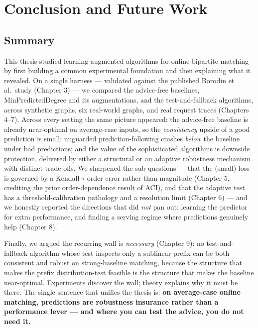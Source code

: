 \chapter{Conclusion and Future Work}\label{conclusion-and-future-work}

\section{Summary}\label{summary}

This thesis studied learning-augmented algorithms for online bipartite matching by first
building a common experimental foundation and then explaining what it revealed. On a single
harness --- validated against the published Borodin et al.~study (Chapter 3) --- we compared the
advice-free baselines, MinPredictedDegree and its augmentations, and the test-and-fallback
algorithms, across synthetic graphs, six real-world graphs, and real request traces
(Chapters 4--7). Across every setting the same picture appeared: the advice-free baseline is
already near-optimal on average-case inputs, so the \emph{consistency} upside of a good prediction
is small; unguarded prediction-following crashes \emph{below} the baseline under bad predictions;
and the value of the sophisticated algorithms is downside protection, delivered by either a
structural or an adaptive robustness mechanism with distinct trade-offs. We sharpened the
sub-questions --- that the (small) loss is governed by a Kendall-\(\tau\) order error rather than
magnitude (Chapter 5, crediting the prior order-dependence result of ACI), and that the
adaptive test has a threshold-calibration pathology and a resolution limit (Chapter 6) --- and
we honestly reported the directions that did \emph{not} pan out: learning the predictor for extra
performance, and finding a serving regime where predictions genuinely help (Chapter 8).

Finally, we argued the recurring wall is \emph{necessary} (Chapter 9): no test-and-fallback
algorithm whose test inspects only a sublinear prefix can be both consistent and robust on
strong-baseline matching, because the structure that makes the prefix distribution-test
feasible is the structure that makes the baseline near-optimal. Experiments discover the
wall; theory explains why it must be there. The single sentence that unifies the thesis is:
\textbf{on average-case online matching, predictions are robustness insurance rather than a
performance lever --- and where you can test the advice, you do not need it.}

